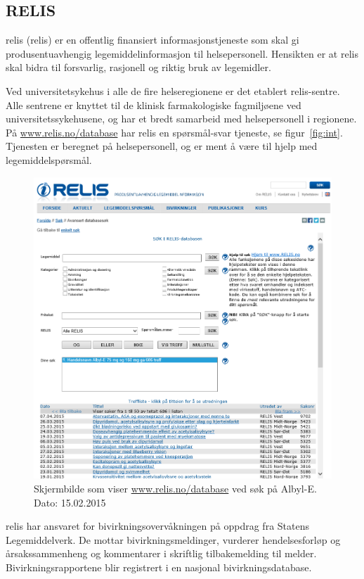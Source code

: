 \subsection{RELIS}
\acrshort{relis} (\acrlong{relis}) er en offentlig finansiert informasjonstjeneste som skal gi produsentuavhengig legemiddelinformasjon til helsepersonell. Hensikten er at \acrshort{relis} skal bidra til forsvarlig, rasjonell og riktig bruk av legemidler.
 
Ved universitetsykehus i alle de fire helseregionene er det etablert \acrshort{relis}-sentre. Alle sentrene er knyttet til de klinisk farmakologiske fagmiljøene ved universitetssykehusene, og har et bredt samarbeid med helsepersonell i regionene. På \url{www.relis.no/database} har \acrshort{relis} en spørsmål-svar tjeneste, se figur~\ref{fig:int}. Tjenesten er beregnet på helsepersonell, og er ment å være til hjelp med legemiddelspørsmål.

\begin{figure}[H]
  \centering
    \includegraphics[width=1\textwidth]{fig/dagens/relis.png}
  \caption{Skjermbilde som viser \url{www.relis.no/database} ved søk på Albyl-E.  Dato: 15.02.2015}
\label{fig:relis}
\end{figure}

\acrshort{relis} har ansvaret for bivirkningsovervåkningen på oppdrag fra Statens Legemiddelverk. De mottar bivirkningsmeldinger, vurderer hendelsesforløp og årsakssammenheng og kommentarer i skriftlig tilbakemelding til melder. Bivirkningsrapportene blir registrert i en nasjonal bivirkningsdatabase.


